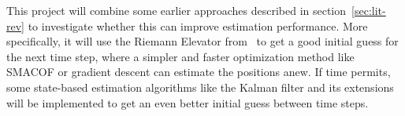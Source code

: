This project will combine some earlier approaches described in section~\ref{sec:lit-rev} to investigate whether this can improve estimation performance. More specifically, it will use the Riemann Elevator from~\cite{R_elevator} to get a good initial guess for the next time step, where a simpler and faster optimization method like SMACOF or gradient descent can estimate the positions anew. If time permits, some state-based estimation algorithms like the Kalman filter and its extensions will be implemented to get an even better initial guess between time steps. 